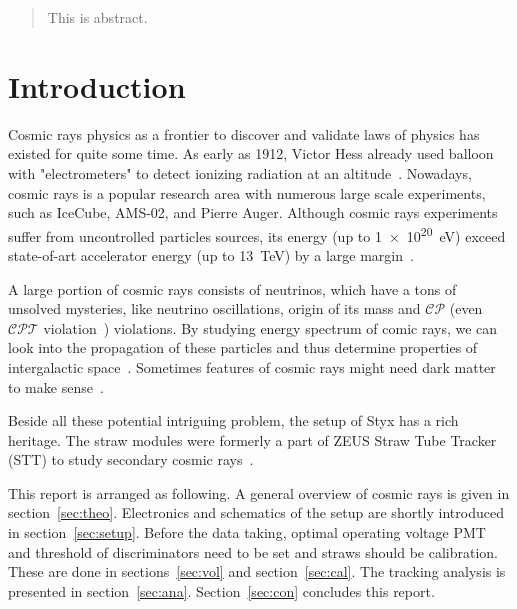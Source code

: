 \begin{abstract}
	This is abstract.
\end{abstract}

\section{Introduction}
Cosmic rays physics as a frontier to discover and validate laws of physics has existed for quite some time. As early as 1912, Victor Hess already used balloon with "electrometers" to detect ionizing radiation at an altitude~\cite{wiki:cosmic}. Nowadays, cosmic rays is a popular research area with numerous large scale experiments, such as IceCube, AMS-02, and Pierre Auger. Although cosmic rays experiments suffer from uncontrolled particles sources, its energy (up to \SI{1e20}{\eV}) exceed state-of-art accelerator energy (up to \SI{13}{\tera\eV}) by a large margin~\cite{Gaisser}. 

A large portion of cosmic rays consists of neutrinos, which have a tons of unsolved mysteries, like neutrino oscillations, origin of its mass and $\mathcal{CP}$ (even $\mathcal{CPT}$ violation~\cite{Barenboim_2017}) violations. By studying energy spectrum of comic rays, we can look into the propagation of these particles and thus determine properties of intergalactic space~\cite{Gaisser}. Sometimes features of cosmic rays might need dark matter to make sense~\cite{grupen}\cite{Gomez_Coral_2020}.

Beside all these potential intriguing problem, the setup of Styx has a rich heritage. The straw modules were formerly a part of ZEUS Straw Tube Tracker (STT) to study secondary cosmic rays~\cite{Styx}.

This report is arranged as following. A general overview of cosmic rays is given in section~\ref{sec:theo}. Electronics and schematics of the setup are shortly introduced in section~\ref{sec:setup}. Before the data taking, optimal operating voltage PMT and threshold of discriminators need to be set and straws should be calibration. These are done in sections~\ref{sec:vol} and section~\ref{sec:cal}. The tracking analysis is presented in section~\ref{sec:ana}. Section~\ref{sec:con} concludes this report.
